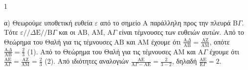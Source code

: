 \begin{ylh}{1}
    \item [Ύλη από εικόνα]
\end{ylh}
\begin{figure} %
\centering
{}
\end{figure}


α) Θεωρούμε υποθετική ευθεία $\varepsilon$ από το σημείο A παράλληλη προς την πλευρά B$\Gamma$. Τότε $\varepsilon // \Delta \text{E} // \text{B}\Gamma$ και οι $\text{AB}$, $\text{AM}$, $\text{A}\Gamma$ είναι τέμνουσες των ευθειών αυτών. Από το Θεώρημα του Θαλή για τις τέμνουσες $\text{AB}$ και $\text{AM}$ έχουμε ότι $\frac{{\text{A}\Delta }}{{\text{AB}}} = \frac{{\text{AZ}}}{{\text{AM}}}$, οπότε $\frac{{\text{A}\Delta }}{{\text{AB}}} = \frac{2}{3}$ (1). Από το Θεώρημα του Θαλή για τις τέμνουσες $\text{AM}$ και $\text{A}\Gamma$ έχουμε ότι $\frac{{\text{AE}}}{{\text{A}\Gamma }} = \frac{{\text{AZ}}}{{\text{AM}}} = \frac{2}{3}$ (2). Από ιδιότητες αναλογιών $\frac{{\text{AE}}}{{\text{A}\Gamma  - \text{AE}}} = \frac{2}{{3 - 2}}$, δηλαδή $\frac{{\text{AE}}}{{\text{E}\Gamma }} = 2$.

